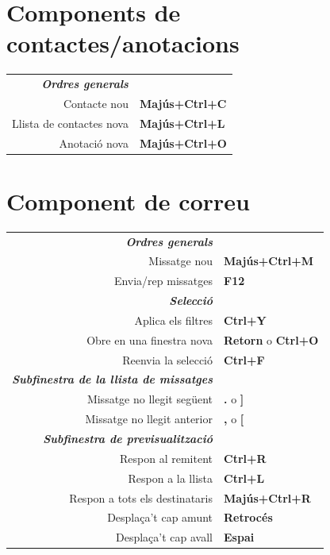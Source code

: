 \documentclass[12pt]{article}
\begin{document}
\begin{landscape}
\begin{center}
\begin{multicols}{2}
	\section*{Components de contactes/anotacions}
	\begin{tabular*}{4in}{rp{1.5in}}
		\textit{\textbf{Ordres generals}}	&					\\
		Contacte nou				& \textbf{Majús+Ctrl+C}			\\
		Llista de contactes nova			& \textbf{Majús+Ctrl+L}			\\
		Anotació nova				& \textbf{Majús+Ctrl+O}			\\
	\end{tabular*}
	\section*{Component de correu}
	\begin{tabular*}{4in}{rp{1.5in}}
		\textit{\textbf{Ordres generals}}	&					\\
		Missatge nou				& \textbf{Majús+Ctrl+M}			\\
		\vspace{1.5mm}
		Envia/rep missatges			& \textbf{F12}				\\
		\textit{\textbf{Selecció}}		&					\\
		Aplica els filtres				& \textbf{Ctrl+Y}			\\
		Obre en una finestra nova 			& \textbf{Retorn} o \textbf{Ctrl+O}	\\
		\vspace{1.5mm}
		Reenvia la selecció			& \textbf{Ctrl+F}			\\
		\textit{\textbf{Subfinestra de la llista de missatges}}	&					\\
		Missatge no llegit següent			& \textbf{.} o \textbf{]}		\\
		\vspace{1.5mm}
		Missatge no llegit anterior			& \textbf{,} o \textbf{[}		\\
		\textit{\textbf{Subfinestra de previsualització}}		&					\\
		Respon al remitent				& \textbf{Ctrl+R}			\\
		Respon a la llista				& \textbf{Ctrl+L}			\\
		Respon a tots els destinataris 		& \textbf{Majús+Ctrl+R}			\\
		Desplaça't cap amunt				& \textbf{Retrocés}			\\
		Desplaça't cap avall				& \textbf{Espai}			\\
	\end{tabular*}

\end{multicols}
\end{center}
\end{landscape}
\end{document}
